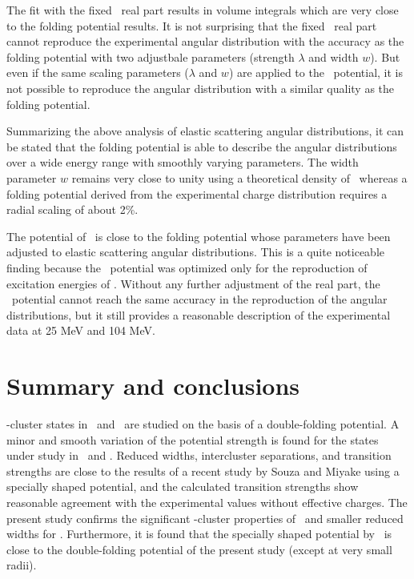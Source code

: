 The fit with the fixed \SM\ real part results in volume integrals which are
very close to the folding potential results. It is not surprising that the
fixed \SM\ real part cannot reproduce the experimental angular distribution
with the accuracy as the folding potential with two adjustbale parameters
(strength $\lambda$ and width $w$). But even if the same scaling parameters
($\lambda$ and $w$) are applied to the \SM\ potential, it is not possible to
reproduce the angular distribution with a similar quality as the folding
potential.
 
Summarizing the above analysis of elastic scattering angular distributions, it
can be stated that the folding potential is able to describe the angular
distributions over a wide energy range with smoothly varying parameters. The
width parameter $w$ remains very close to unity using a theoretical density of
\tinull\ whereas a folding potential derived from the experimental charge
distribution requires a radial scaling of about 2\%. 

The potential of \SM\ is close to the folding potential whose parameters have
been adjusted to elastic scattering angular distributions. This is a quite
noticeable finding because the \SM\ potential was optimized only for the
reproduction of excitation energies of \criv . Without any further adjustment
of the real part, the \SM\ potential cannot reach the same accuracy in the
reproduction of the angular distributions, but it still provides a reasonable
description of the experimental data at 25 MeV and 104 MeV.


\section{Summary and conclusions}
\label{sec:conc}
%
\al -cluster states in \crvi\ and \criv\ are studied on the basis of a
double-folding potential. A minor and smooth variation of the potential
strength is found for the states under study in \crvi\ and \criv . Reduced
widths, intercluster separations, and transition strengths are close to the
results of a recent study by Souza and Miyake \cite{Sou17} using a specially
shaped potential, and the calculated transition strengths show reasonable
agreement with the experimental values without effective charges. The present
study confirms the significant \al -cluster properties of \crvi\ and smaller
reduced widths for \criv . Furthermore, it is found that the specially shaped
potential by \SM\ is close to the double-folding potential of the present
study (except at very small radii).

